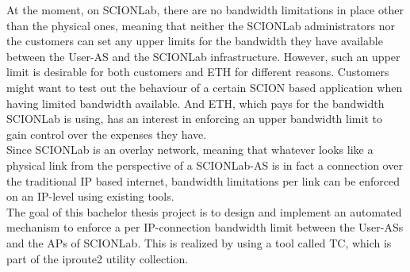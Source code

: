 At the moment, on \acs{SCIONLab}, there are no bandwidth limitations in place other than the physical ones, meaning that neither the \acs{SCIONLab} administrators nor the customers can set any upper limits for the bandwidth they have available between the User-\acs{AS} and the \acs{SCIONLab} infrastructure. However, such an upper limit is desirable for both customers and \acs{ETH} for different reasons. Customers might want to test out the behaviour of a certain \acs{SCION} based application when having limited bandwidth available. And \acs{ETH}, which pays for the bandwidth \acs{SCIONLab} is using, has an interest in enforcing an upper bandwidth limit to gain control over the expenses they have.
\\
Since \acs{SCIONLab} is an overlay network, meaning that whatever looks like a physical link from the perspective of a \acs{SCIONLab}-\acs{AS} is in fact a connection over the traditional \acs{IP} based internet, bandwidth limitations per link can be enforced on an \acs{IP}-level using existing tools.
\\
The goal of this bachelor thesis project is to design and implement an automated mechanism to enforce a per \acs{IP}-connection bandwidth limit between the User-\acsp{AS} and the \aclp{AP} of \acs{SCIONLab}. This is realized by using a tool called \ac{TC}, which is part of the iproute2 utility collection.


